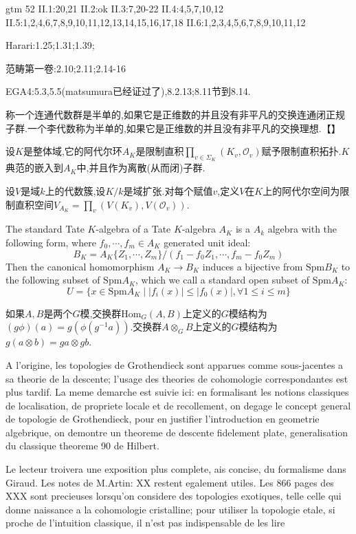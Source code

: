 gtm 52  
II.1:20,21
II.2:ok
II.3:7,20-22
II.4:4,5,7,10,12
II.5:1,2,4,6,7,8,9,10,11,12,13,14,15,16,17,18
II.6:1,2,3,4,5,6,7,8,9,10,11,12

Harari:1.25;1.31;1.39;

范畴第一卷:2.10;2.11;2.14-16

EGA4:5.3,5.5(matsumura已经证过了),8.2.13;8.11节到8.14.




称一个连通代数群是半单的,如果它是正维数的并且没有非平凡的交换连通闭正规子群.一个李代数称为半单的,如果它是正维数的并且没有非平凡的交换理想.【】

\item 设$K$是整体域,它的阿代尔环$A_K$是限制直积$\prod_{v\in\Sigma_K}(K_v,\mathscr{O}_v)$赋予限制直积拓扑.$K$典范的嵌入到$A_K$中,并且作为离散(从而闭)子群.
\item 设$V$是域$k$上的代数簇,设$K/k$是域扩张.对每个赋值$v$,定义$V$在$K$上的阿代尔空间为限制直积空间$V_{A_K}=\prod_v(V(K_v),V(\mathscr{O}_v))$.

The standard Tate $K$-algebra of a Tate $K$-algebra $A_K$ is a $A_k$ algebra with the following form, where $f_0,\cdots,f_m\in A_K$ generated unit ideal:
$$B_K=A_K\{Z_1,\cdots,Z_m\}/(f_1-f_0Z_1,\cdots,f_m-f_0Z_m)$$
Then the canonical homomorphism $A_K\to B_K$ induces a bijective from $\mathrm{Spm}B_K$ to the following subset of $\mathrm{Spm}A_K$, which we call a standard open subset of $\mathrm{Spm}A_K$:
$$U=\{x\in\mathrm{Spm}A_K\mid|f_i(x)|\le |f_0(x)|,\forall 1\le i\le m\}$$

如果$A,B$是两个$G$模,交换群$\mathrm{Hom}_G(A,B)$上定义的$G$模结构为$(g\phi)(a)=g(\phi(g^{-1}a))$.交换群$A\otimes_GB$上定义的$G$模结构为$g(a\otimes b)=ga\otimes gb$.

A l'origine, les topologies de Grothendieck sont apparues comme sous-jacentes a sa theorie de la descente; l'usage des theories de cohomologie correspondantes est plus tardif. La meme demarche est suivie ici: en formalisant les notions classiques de localisation, de propriete locale et de recollement, on degage le concept general de topologie de Grothendieck, pour en justifier l'introduction en geometrie algebrique, on demontre un theoreme de descente fidelement plate, generalisation du classique theoreme 90 de Hilbert.

Le lecteur troivera une exposition plus complete, ais concise, du formalisme dans Giraud. Les notes de M.Artin: XX restent egalement utiles. Les 866 pages des XXX sont precieuses lorsqu'on considere des topologies exotiques, telle celle qui donne naissance a la cohomologie cristalline;  pour utiliser la topologie etale, si proche de l'intuition classique, il n'est pas indispensable de les lire

